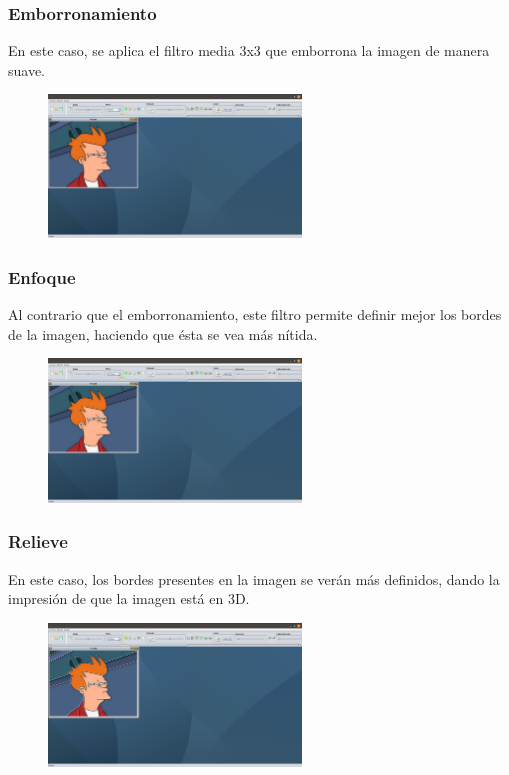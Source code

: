 \documentclass[11pt,a4paper]{article}
\begin{document}
\subsubsection{Emborronamiento}
En este caso, se aplica el filtro media 3x3 que emborrona la imagen de manera suave.

\begin{figure}[H]
\centering
	\includegraphics[width=0.6\textwidth]{img/media.png}
\end{figure}

\subsubsection{Enfoque}
Al contrario que el emborronamiento, este filtro permite definir mejor los bordes de la imagen, haciendo que ésta se vea más nítida.

\begin{figure}[H]
\centering
	\includegraphics[width=0.6\textwidth]{img/enfoque.png}
\end{figure}

\subsubsection{Relieve}
En este caso, los bordes presentes en la imagen se verán más definidos, dando la impresión de que la imagen está en 3D.

\begin{figure}[H]
\centering
	\includegraphics[width=0.6\textwidth]{img/relieve.png}
\end{figure}
\end{document}
